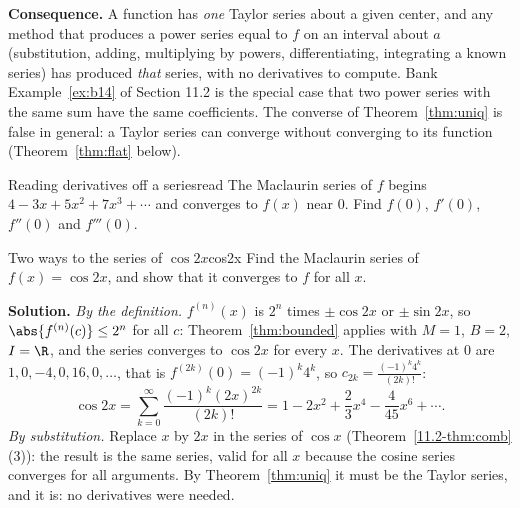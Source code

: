 \documentclass[11pt]{article}
\begin{document}
\textbf{Consequence.} A function has \emph{one} Taylor series about a given center, and any method that produces a power series equal to $f$ on an interval about $a$ (substitution, adding, multiplying by powers, differentiating, integrating a known series) has produced \emph{that} series, with no derivatives to compute. Bank Example~\ref{ex:b14} of Section 11.2 is the special case that two power series with the same sum have the same coefficients. The converse of Theorem~\ref{thm:uniq} is false in general: a Taylor series can converge without converging to its function (Theorem~\ref{thm:flat} below).

\begin{kc}{Reading derivatives off a series}{read}
The Maclaurin series of $f$ begins $4-3x+5x^2+7x^3+\cdots$ and converges to $f(x)$ near $0$. Find $f(0)$, $f'(0)$, $f''(0)$ and $f'''(0)$.
\end{kc}

\begin{exmp}{Two ways to the series of $\cos2x$}{cos2x}
Find the Maclaurin series of $f(x)=\cos2x$, and show that it converges to $f$ for all $x$.

\textbf{Solution.} \emph{By the definition.} $f^{(n)}(x)$ is $2^n$ times $\pm\cos2x$ or $\pm\sin2x$, so $\abs{f^{(n)}(c)}\le2^n$ for all $c$: Theorem~\ref{thm:bounded} applies with $M=1$, $B=2$, $I=\R$, and the series converges to $\cos2x$ for every $x$. The derivatives at $0$ are $1,0,-4,0,16,0,\dots$, that is $f^{(2k)}(0)=(-1)^k4^k$, so $c_{2k}=\frac{(-1)^k4^k}{(2k)!}$:
\[
\cos2x=\sum_{k=0}^\infty\frac{(-1)^k(2x)^{2k}}{(2k)!}=1-2x^2+\frac23x^4-\frac4{45}x^6+\cdots .
\]
\emph{By substitution.} Replace $x$ by $2x$ in the series of $\cos x$ (Theorem~\ref{11.2-thm:comb}(3)): the result is the same series, valid for all $x$ because the cosine series converges for all arguments. By Theorem~\ref{thm:uniq} it must be the Taylor series, and it is: no derivatives were needed.
\end{exmp}
\end{document}

